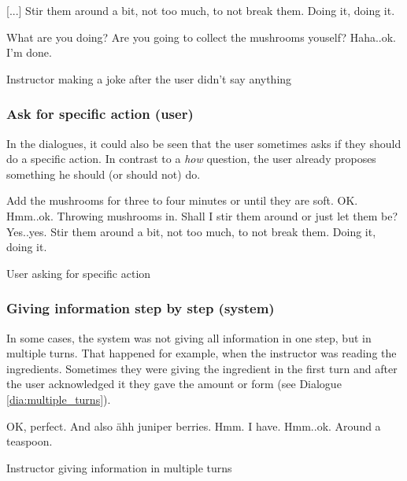\documentclass[
	11pt, %
]{fphw}
\newenvironment{captionedDialogue}
    {\captionsetup{
        type=Dialogue,
        skip=2pt,
        belowskip=13pt
        }
    }
    {}
\newenvironment{mydialogue}
    {\begin{snugshade}
     \hrulefill
     \begin{dialogue}}
    {\end{dialogue}
     \hrulefill
     \end{snugshade}}
\begin{document}
\begin{captionedDialogue}
    \begin{mydialogue}
         [...] Stir them around a bit, not too much, to not break them. 
         Doing it, doing it. 
        
        \medskip
        \medskip

         What are you doing? Are you going to collect the mushrooms youself?
         Haha..ok. I'm done.
    \end{mydialogue}
    \caption{Instructor making a joke after the user didn't say anything}
    \label{dia:joke}
\end{captionedDialogue}

\subsubsection*{Ask for specific action (user)}
In the dialogues, it could also be seen that the user sometimes asks if they should do a specific action. In contrast to a \emph{how} question, the user already proposes something he should (or should not) do.
\begin{captionedDialogue}
    \begin{mydialogue}
         Add the mushrooms for three to four minutes or until they are soft.
         OK. Hmm..ok. Throwing mushrooms in. Shall I stir them around or just let them be? 
         Yes..yes. Stir them around a bit, not too much, to not break them. 
         Doing it, doing it. 
    \end{mydialogue}
    \caption{User asking for specific action}
    \label{dia:asking_action}
\end{captionedDialogue}

\subsubsection*{Giving information step by step (system)}
In some cases, the system was not giving all information in one step, but in multiple turns. That happened for example, when the instructor was reading the ingredients. Sometimes they were giving the ingredient in the first turn and after the user acknowledged it they gave the amount or form (see Dialogue \ref{dia:multiple_turns}).

\begin{captionedDialogue}
    \begin{mydialogue}
         OK, perfect. And also ähh juniper berries. 
         Hmm. I have.
         Hmm..ok. Around a teaspoon.
    \end{mydialogue}
    \caption{Instructor giving information in multiple turns}
    \label{dia:multiple_turns}
\end{captionedDialogue}
\end{document}
